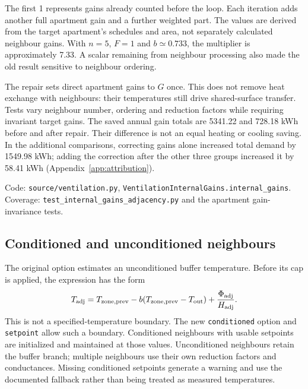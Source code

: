 The first 1 represents gains already counted before the loop. Each iteration adds another full apartment gain and a further weighted part. The values are derived from the target apartment's schedules and area, not separately calculated neighbour gains. With $n=5$, $F=1$ and $b\simeq0.733$, the multiplier is approximately 7.33. A scalar remaining from neighbour processing also made the old result sensitive to neighbour ordering.

The repair sets direct apartment gains to $G$ once. This does not remove heat exchange with neighbours: their temperatures still drive shared-surface transfer. Tests vary neighbour number, ordering and reduction factors while requiring invariant target gains. The saved annual gain totals are 5341.22 and 728.18 kWh before and after repair. Their difference is not an equal heating or cooling saving. In the additional comparisons, correcting gains alone increased total demand by 1549.98 kWh; adding the correction after the other three groups increased it by 58.41 kWh (Appendix~\ref{app:attribution}).

Code: \nolinkurl{source/ventilation.py}, \nolinkurl{VentilationInternalGains.internal_gains}. Coverage: \nolinkurl{test_internal_gains_adjacency.py} and the apartment gain-invariance tests.

\subsection{Conditioned and unconditioned neighbours}
\label{app:neighbours}
The original option estimates an unconditioned buffer temperature. Before its cap is applied, the expression has the form
\begin{equation}
T_{\rm adj}=T_{\rm zone,prev}-b(T_{\rm zone,prev}-T_{\rm out})
+\frac{\Phi_{\rm adj}}{H_{\rm adj}}.
\end{equation}
This is not a specified-temperature boundary. The new \nolinkurl{conditioned} option and \nolinkurl{setpoint} allow such a boundary. Conditioned neighbours with usable setpoints are initialized and maintained at those values. Unconditioned neighbours retain the buffer branch; multiple neighbours use their own reduction factors and conductances. Missing conditioned setpoints generate a warning and use the documented fallback rather than being treated as measured temperatures.

